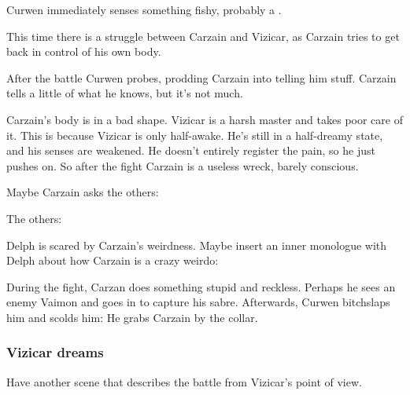 Curwen immediately senses something fishy, probably a \vertexspike{}. 

This time there is a struggle between Carzain and Vizicar, as Carzain tries to get back in control of his own body. 


After the battle Curwen probes, prodding Carzain into telling him stuff. Carzain tells a little of what he knows, but it's not much. 

Carzain's body is in a bad shape. 
Vizicar is a harsh master and takes poor care of it. 
This is because Vizicar is only half-awake. 
He's still in a half-dreamy state, and his senses are weakened. 
He doesn't entirely register the pain, so he just pushes on. 
So after the fight Carzain is a useless wreck, barely conscious. 

Maybe Carzain asks the others:  

The others: 

Delph is scared by Carzain's weirdness. Maybe insert an inner monologue with Delph about how Carzain is a crazy weirdo: 

During the fight, Carzan does something stupid and reckless. 
Perhaps he sees an enemy Vaimon and goes in to capture his sabre. 
Afterwards, Curwen bitchslaps him and scolds him: 
He grabs Carzain by the collar. 





\subsubsection{Vizicar dreams}
Have another scene that describes the battle from Vizicar's point of view. 





